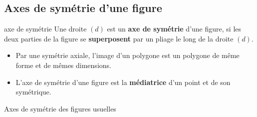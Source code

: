 \begin{pageCours}

\section{Axes de symétrie d'une figure}

\begin{DefT}{axe de symétrie}
Une droite $(d)$ est un \textbf{axe de symétrie} d'une figure, si les deux parties de la figure se \textbf{superposent} par un pliage le long de la droite $(d)$.
\end{DefT}

\begin{Cq}
\begin{itemize}[leftmargin=*]
\item Par une symétrie axiale, l'image d'un polygone est un polygone de même forme et de mêmes dimensions.
\item L'axe de symétrie d'une figure est la \textbf{médiatrice} d'un point et de son symétrique.
\end{itemize}
\end{Cq}


\begin{PpT}{Axes de symétrie des figures usuelles}
\begin{center}
\hspace{1cm}
\hspace{1cm}


\end{center}
\end{PpT}
\end{pageCours}
